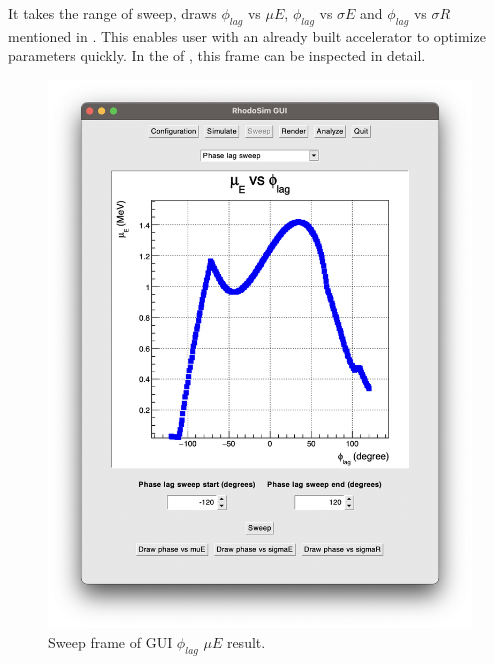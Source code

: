 \documentclass[a4paper,oneside,12pt]{report}
\numberwithin{equation}{chapter}
\begin{document}
{It takes the range of sweep, draws $\phi_{lag}$ vs $\mu E$, $\phi_{lag}$ vs $\sigma E$ and $\phi_{lag}$ vs $\sigma R$ mentioned in .
This enables user with an already built accelerator to optimize \egun parameters quickly. 
In the  of , this frame can be inspected in detail.
\vspace{10pt}
\begin{figure}[h]
    \centering
    \includegraphics[width=0.85\linewidth]{./figures/rhodoSim/GUI_sweep_muE_3.png}
    \vspace{-20pt}
    \caption{Sweep frame of GUI $\phi_{lag}$ $\mu E$ result.}
    \label{fig:gui_sweep_muE}
\end{figure}
\clearpage
\begin{figure}[h]
    \centering

\end{figure}}
\end{document}
